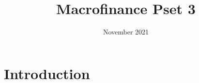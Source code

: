 \documentclass{article}
\title{Macrofinance Pset 3}
\author{ }
\date{November 2021}
\begin{document}
\maketitle

\section{Introduction}
\end{document}

